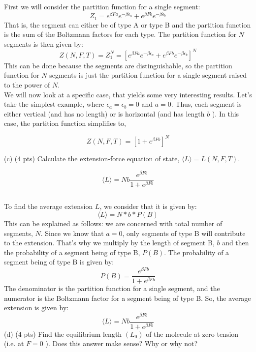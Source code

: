 \documentclass[12pt]{article}
\begin{document}
\subsection{}
First we will consider the partition function for a single segment:
\begin{equation}
  Z_1 = e^{\beta F a} e^{-\beta \epsilon_{a}} + e^{\beta F b} e^{-\beta \epsilon_{b}}
\end{equation}
That is, the segment can either be of type A or type B and the partition function is the sum of the Boltzmann factors for each type. The partition function for $N$ segments is then given by:
\begin{equation}
  Z(N, F, T) = Z_1^N = \left[e^{\beta F a} e^{-\beta \epsilon_{a}} + e^{\beta F b} e^{-\beta \epsilon_{b}}\right]^N
\end{equation}
This can be done because the segments are distinguishable, so the partition function for $N$ segments is just the partition function for a single segment raised to the power of $N$.\\
We will now look at a specific case, that yields some very interesting results. Let's take the simplest example, where $\epsilon_{a}=\epsilon_{b}=0$ and $a=0$. Thus, each segment is either vertical (and has no length) or is horizontal (and has length $b$ ). In this case, the partition function simplifies to,

$$
Z(N, F, T)=\left[1+e^{\beta F b}\right]^{N}
$$

(c) (4 pts) Calculate the extension-force equation of state, $\langle L\rangle=L(N, F, T)$.

$$
\langle L\rangle=N b \frac{e^{\beta F b}}{1+e^{\beta F b}}
$$
\subsection{}
To find the average extension $L$, we consider that it is given by:
\begin{equation}
  \langle L\rangle =N*b*P(B)
\end{equation}
This can be explained as follows: we are concerned with total number of segments, $N$. Since we know that $a=0$, only segments of type B will contribute to the extension. That's why we multiply by the length of segment B, $b$ and then the probability of a segment being of type B, $P(B)$. The probability of a segment being of type B is given by:
\begin{equation}
  P(B) = \frac{e^{\beta F b}}{1+e^{\beta F b}}
\end{equation}
The denominator is the partition function for a single segment, and the numerator is the Boltzmann factor for a segment being of type B. So, the average extension is given by:
\begin{equation}
  \langle L \rangle = N b \frac{e^{\beta F b}}{1+e^{\beta F b}}
\end{equation}
(d) (4 pts) Find the equilibrium length $\left(L_{0}\right)$ of the molecule at zero tension (i.e. at $F=0$ ). Does this answer make sense? Why or why not?
\end{document}
